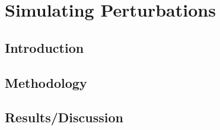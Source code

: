 \documentclass[Space3_Assign1.tex]{subfiles}
\begin{document}
\section{Simulating Perturbations}

\subsection{Introduction}

\subsection{Methodology}

\subsection{Results/Discussion}
\end{document}
